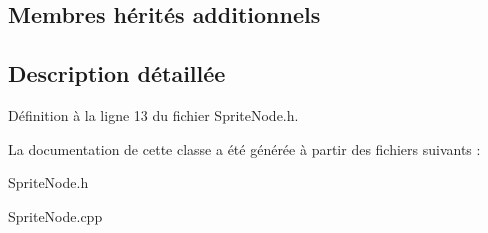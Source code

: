 \subsection*{Membres hérités additionnels}


\subsection{Description détaillée}


Définition à la ligne 13 du fichier Sprite\+Node.\+h.



La documentation de cette classe a été générée à partir des fichiers suivants \+:\begin{DoxyCompactItemize}
\item 
Sprite\+Node.\+h\item 
Sprite\+Node.\+cpp\end{DoxyCompactItemize}
